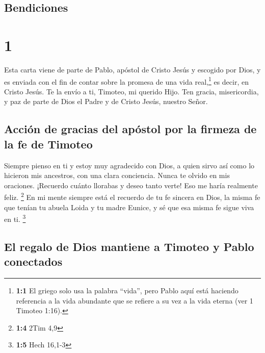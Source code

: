 \hypertarget{bendiciones}{%
\subsection{Bendiciones}\label{bendiciones}}

\hypertarget{section}{%
\section{1}\label{section}}

 Esta carta viene de parte de Pablo, apóstol de Cristo
Jesús y escogido por Dios, y es enviada con el fin de contar sobre la
promesa de una vida real,\footnote{\textbf{1:1} El griego solo usa la
  palabra ``vida'', pero Pablo aquí está haciendo referencia a la vida
  abundante que se refiere a su vez a la vida eterna (ver 1 Timoteo
  1:16).} es decir, en Cristo Jesús.  Te la envío a ti,
Timoteo, mi querido Hijo. Ten gracia, misericordia, y paz de parte de
Dios el Padre y de Cristo Jesús, nuestro Señor.

\hypertarget{acciuxf3n-de-gracias-del-apuxf3stol-por-la-firmeza-de-la-fe-de-timoteo}{%
\subsection{Acción de gracias del apóstol por la firmeza de la fe de
Timoteo}\label{acciuxf3n-de-gracias-del-apuxf3stol-por-la-firmeza-de-la-fe-de-timoteo}}

 Siempre pienso en ti y estoy muy agradecido con Dios, a
quien sirvo así como lo hicieron mis ancestros, con una clara
conciencia. Nunca te olvido en mis oraciones.  ¡Recuerdo
cuánto llorabas y deseo tanto verte! Eso me haría realmente feliz.
\footnote{\textbf{1:4} 2Tim 4,9}  En mi mente siempre está
el recuerdo de tu fe sincera en Dios, la misma fe que tenían tu abuela
Loida y tu madre Eunice, y sé que esa misma fe sigue viva en ti.
\footnote{\textbf{1:5} Hech 16,1-3}

\hypertarget{el-regalo-de-dios-mantiene-a-timoteo-y-pablo-conectados}{%
\subsection{El regalo de Dios mantiene a Timoteo y Pablo
conectados}\label{el-regalo-de-dios-mantiene-a-timoteo-y-pablo-conectados}}

